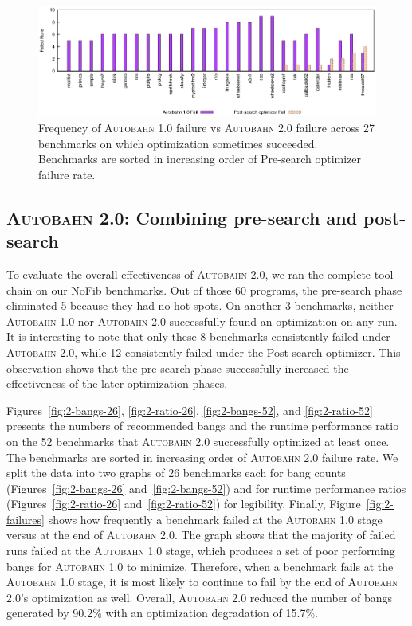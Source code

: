 \documentclass[format=sigplan, review=true, 9pt]{acmart}
\newcommand{\figref}[1]{Figure~\ref{#1}}
\newcommand{\scaption}[1]{\caption{#1}}
\newcommand{\hotspots}[0]{hot spots}
\newcommand{\Ao}[0]{\textsc{Autobahn 1.0}}
\newcommand{\At}[0]{\textsc{Autobahn 2.0}}
\newcommand{\preopt}[0]{pre-search}
\newcommand{\postopt}[0]{post-search}
\newcommand{\Preopt}[0]{Pre-search}
\newcommand{\Postopt}[0]{Post-search}
\begin{document}
\begin{figure}
\includegraphics[width=\textwidth]{aut-post-fail}
\scaption{Frequency of \Ao{} failure vs \At{} failure across 27
benchmarks on which optimization sometimes succeeded. Benchmarks are sorted in
increasing order of \Preopt{} optimizer failure rate. } 
\label{fig:post-failures}
\end{figure}

\subsection{\At{}: Combining \preopt{} and \postopt{}}

To evaluate the overall effectiveness of \At{}, we ran the complete
tool chain on our NoFib benchmarks. Out of those 60
programs, the \preopt{} phase eliminated 5 because they had
no \hotspots{}.  On another 3 benchmarks, neither \Ao{} nor \At{} 
successfully found an optimization on any run. 
It is interesting to note that only these 8
benchmarks consistently failed under \At{}, while 12
consistently failed under the \Postopt{} optimizer. 
This observation shows that the \preopt{} phase successfully
increased the effectiveness of the later optimization phases. 

Figures~\ref{fig:2-bangs-26}, \ref{fig:2-ratio-26}, \ref{fig:2-bangs-52},
and \ref{fig:2-ratio-52} presents the numbers of recommended bangs and
the runtime performance ratio on the 52 benchmarks that \At{} 
successfully optimized at least once.
The benchmarks are sorted in increasing order of \At{} failure rate.
We split the data into two graphs of 26 benchmarks each for bang counts
(Figures~\ref{fig:2-bangs-26} and~\ref{fig:2-bangs-52})
and for runtime performance ratios
(Figures~\ref{fig:2-ratio-26} and~\ref{fig:2-ratio-52})
for legibility. 
Finally, \figref{fig:2-failures} shows how frequently a benchmark
failed at the \Ao{} stage versus at the end of \At{}. The graph shows that the majority of
failed runs failed at the \Ao{} stage, which produces a set of poor performing bangs for
\Ao{} to minimize. Therefore, when a benchmark fails at the \Ao{} stage, it is most likely
to continue to fail by the end of \At{}'s optimization as well. Overall, \At{}
reduced the number of bangs generated by 90.2\%
with an optimization degradation of 15.7\%.
\end{document}
